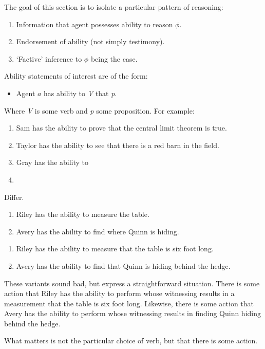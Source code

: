 \documentclass[10pt]{article}
\begin{document}
\begin{note}
  The goal of this section is to isolate a particular pattern of reasoning:
  \begin{enumerate}
  \item Information that agent possesses ability to reason \(\phi\).
  \item Endorsement of ability (not simply testimony).
  \item `Factive' inference to \(\phi\) being the case.
  \end{enumerate}

  Ability statements of interest are of the form:
  \begin{itemize}
  \item Agent \(a\) has ability to \emph{V} that \emph{p}.
  \end{itemize}
  Where \emph{V} is some verb and \emph{p} some proposition.
  For example:
  \begin{enumerate}
  \item Sam has the ability to prove that the central limit theorem is true.
  \item Taylor has the ability to see that there is a red barn in the field.
  \item Gray has the ability to 
  \item 
  \end{enumerate}

  Differ.
  \begin{enumerate}
  \item Riley has the ability to measure the table.
  \item Avery has the ability to find where Quinn is hiding.
  \end{enumerate}

  \begin{enumerate}
  \item Riley has the ability to measure that the table is six foot long.
  \item Avery has the ability to find that Quinn is hiding behind the hedge.
  \end{enumerate}
  These variants sound bad, but express a straightforward situation.
  There is some action that Riley has the ability to perform whose witnessing results in a measurement that the table is six foot long.
  Likewise, there is some action that Avery has the ability to perform whose witnessing results in finding Quinn hiding behind the hedge.

  What matters is not the particular choice of verb, but that there is some action.


\end{note}
\end{document}
